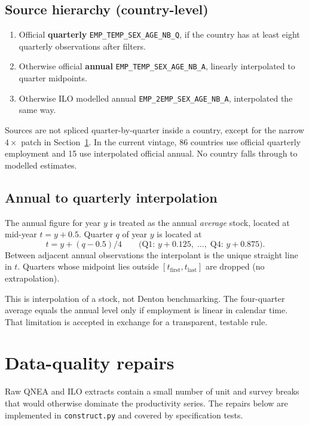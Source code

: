 \documentclass[11pt]{article}
\begin{document}
\subsection{Source hierarchy (country-level)}

\begin{enumerate}
\item Official \textbf{quarterly} \texttt{EMP\_TEMP\_SEX\_AGE\_NB\_Q}, if the
country has at least eight quarterly observations after filters.
\item Otherwise official \textbf{annual} \texttt{EMP\_TEMP\_SEX\_AGE\_NB\_A},
linearly interpolated to quarter midpoints.
\item Otherwise ILO modelled annual \texttt{EMP\_2EMP\_SEX\_AGE\_NB\_A},
interpolated the same way.
\end{enumerate}

Sources are not spliced quarter-by-quarter inside a country, except for the
narrow $4\times$ patch in Section~\ref{sec:quality}. In the current vintage,
86 countries use official quarterly employment and 15 use interpolated
official annual. No country falls through to modelled estimates.

\subsection{Annual to quarterly interpolation}

The annual figure for year $y$ is treated as the annual \emph{average} stock,
located at mid-year $t=y+0.5$. Quarter $q$ of year $y$ is located at
\begin{equation}
t = y + (q-0.5)/4
\qquad\text{(Q1: }y+0.125,\;\ldots,\;\text{Q4: }y+0.875\text{)}.
\end{equation}
Between adjacent annual observations the interpolant is the unique straight
line in $t$. Quarters whose midpoint lies outside
$[t_{\mathrm{first}},t_{\mathrm{last}}]$ are dropped (no extrapolation).

This is interpolation of a stock, not Denton benchmarking. The four-quarter
average equals the annual level only if employment is linear in calendar
time. That limitation is accepted in exchange for a transparent, testable
rule.

\section{Data-quality repairs}
\label{sec:quality}

Raw QNEA and ILO extracts contain a small number of unit and survey breaks
that would otherwise dominate the productivity series. The repairs below are
implemented in \texttt{construct.py} and covered by specification tests.
\end{document}
